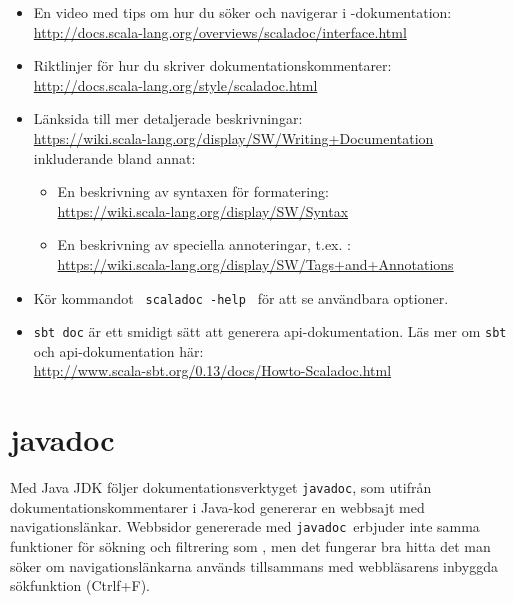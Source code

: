 \begin{itemize}[leftmargin=*]

\item En video med tips om hur du söker och navigerar i \scaladoc-dokumentation: 
\\
\url{http://docs.scala-lang.org/overviews/scaladoc/interface.html}

\item
Riktlinjer för hur du skriver dokumentationskommentarer: \\
\url{http://docs.scala-lang.org/style/scaladoc.html}

\item Länksida till mer detaljerade beskrivningar: \\
\url{https://wiki.scala-lang.org/display/SW/Writing+Documentation} \\
inkluderande bland annat:

\begin{itemize}[nolistsep]
\item En beskrivning av syntaxen för formatering: \\
\url{https://wiki.scala-lang.org/display/SW/Syntax} 

\item En beskrivning av speciella annoteringar, t.ex. : \\
\url{https://wiki.scala-lang.org/display/SW/Tags+and+Annotations} 

\end{itemize}

\item Kör kommandot \texttt{ scaladoc -help } för att se användbara optioner.

\item \texttt{sbt doc} är ett smidigt sätt att generera api-dokumentation. Läs mer om \texttt{sbt} och api-dokumentation här: \\
\url{http://www.scala-sbt.org/0.13/docs/Howto-Scaladoc.html}


\end{itemize}

\clearpage

\section{javadoc}
\newcommand{\javadoc}{\texttt{javadoc}}


Med Java JDK följer dokumentationsverktyget \javadoc, som utifrån dokumentationskommentarer i Java-kod genererar en webbsajt med navigationslänkar. Webbsidor genererade med \javadoc~erbjuder inte samma funktioner för sökning och filtrering som \scaladoc, men det fungerar bra hitta det man söker om navigationslänkarna används tillsammans med webbläsarens inbyggda sökfunktion (Ctrlf+F).

